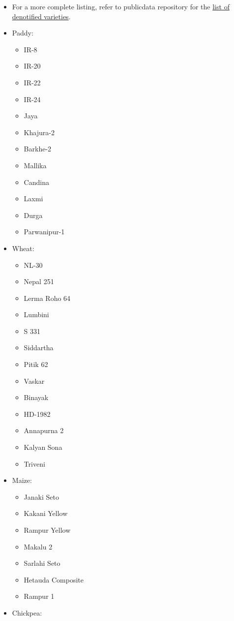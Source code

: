 \documentclass[]{book}
\providecommand{\tightlist}{%
  \setlength{\itemsep}{0pt}\setlength{\parskip}{0pt}}
\begin{document}
\begin{itemize}
\item
  For a more complete listing, refer to publicdata repository for the \href{https://raw.githubusercontent.com/DeependraD/publicdata/master/crop_varieties/denotified_varieties.csv}{list of denotified varieties}.
\item
  Paddy:

  \begin{itemize}
  \tightlist
  \item
    IR-8
  \item
    IR-20
  \item
    IR-22
  \item
    IR-24
  \item
    Jaya
  \item
    Khajura-2
  \item
    Barkhe-2
  \item
    Mallika
  \item
    Candina
  \item
    Laxmi
  \item
    Durga
  \item
    Parwanipur-1
  \end{itemize}
\item
  Wheat:

  \begin{itemize}
  \tightlist
  \item
    NL-30
  \item
    Nepal 251
  \item
    Lerma Roho 64
  \item
    Lumbini
  \item
    S 331
  \item
    Siddartha
  \item
    Pitik 62
  \item
    Vaskar
  \item
    Binayak
  \item
    HD-1982
  \item
    Annapurna 2
  \item
    Kalyan Sona
  \item
    Triveni
  \end{itemize}
\item
  Maize:

  \begin{itemize}
  \tightlist
  \item
    Janaki Seto
  \item
    Kakani Yellow
  \item
    Rampur Yellow
  \item
    Makalu 2
  \item
    Sarlahi Seto
  \item
    Hetauda Composite
  \item
    Rampur 1
  \end{itemize}
\item
  Chickpea:


\end{itemize}
\end{document}
